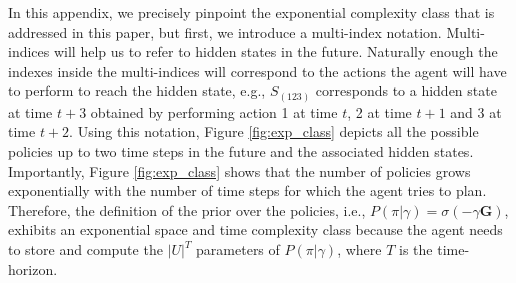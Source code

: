 \documentclass[twoside,11pt]{article}
\begin{document}
In this appendix, we precisely pinpoint the exponential complexity class that is addressed in this paper, but first, we introduce a multi-index notation. Multi-indices will help us to refer to hidden states in the future. Naturally enough the indexes inside the multi-indices will correspond to the actions the agent will have to perform to reach the hidden state, e.g., $S_{(123)}$ corresponds to a hidden state at time $t + 3$ obtained by performing action 1 at time $t$, 2 at time $t + 1$ and 3 at time $t + 2$. Using this notation, Figure \ref{fig:exp_class} depicts all the possible policies up to two time steps in the future and the associated hidden states. Importantly, Figure \ref{fig:exp_class} shows that the number of policies grows exponentially with the number of time steps for which the agent tries to plan. Therefore, the definition of the prior over the policies, i.e., $P(\pi|\gamma) = \sigma(-\gamma \bm{G})$, exhibits an exponential space and time complexity class because the agent needs to store and compute the $|U|^T$ parameters of $P(\pi|\gamma)$, where $T$ is the time-horizon.
\end{document}
